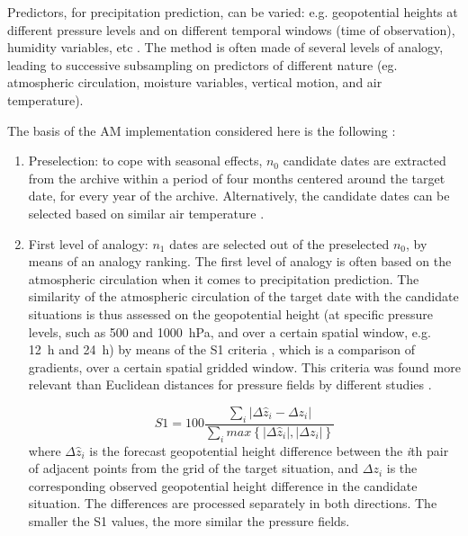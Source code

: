 \documentclass{ametsoc}
\begin{document}
Predictors, for precipitation prediction, can be varied: e.g. geopotential heights at different pressure levels and on different temporal windows (time of observation), humidity variables, etc \citep[see][for a more detailed list]{BenDaoud2016}. The method is often made of several levels of analogy, leading to successive subsampling on predictors of different nature (eg. atmospheric circulation, moisture variables, vertical motion, and air temperature). 

The basis of the AM implementation considered here is the following \citep[same approach as][]{Guilbaud1997, Bontron2005, Marty2012, Horton2012, Radanovics2013, Chardon2014, Dayon2015, BenDaoud2016}:

\begin{enumerate}
	\item Preselection: to cope with seasonal effects, $n_{0}$ candidate dates are extracted from the archive within a period of four months centered around the target date, for every year of the archive. Alternatively, the candidate dates can be selected based on similar air temperature \citep{BenDaoud2010}.
	
	\item First level of analogy: $n_{1}$ dates are selected out of the preselected $n_{0}$, by means of an analogy ranking. The first level of analogy is often based on the atmospheric circulation when it comes to precipitation prediction. The similarity of the atmospheric circulation of the target date with the candidate situations is thus assessed on the geopotential height (at specific pressure levels, such as 500 and 1000~hPa, and over a certain spatial window, e.g. 12~h and 24~h) by means of the S1 criteria \citep[Eq. (\ref{eq:S1}), ][]{Teweles1954, Drosdowsky2003}, which is a comparison of gradients, over a certain spatial gridded window. This criteria was found more relevant than Euclidean distances for pressure fields by different studies \citep{Wilson1980, Woodcock1980, Guilbaud1998, Bontron2004}.
	
	\begin{equation}
	\label{eq:S1}
	S1=100 \frac {\displaystyle \sum_{i} \vert \Delta\hat{z}_{i} - \Delta z_{i} \vert}
	{\displaystyle \sum_{i} max\left\lbrace \vert \Delta\hat{z}_{i} \vert , \vert \Delta z_{i} \vert \right\rbrace }
	\end{equation}
	where $\Delta \hat{z}_{i}$ is the forecast geopotential height difference between the \textit{i}th pair of adjacent points from the grid of the target situation, and $\Delta z_{i}$ is the corresponding observed geopotential height difference in the candidate situation. The differences are processed separately in both directions. The smaller the S1 values, the more similar the pressure fields.
	

\end{enumerate}
\end{document}
